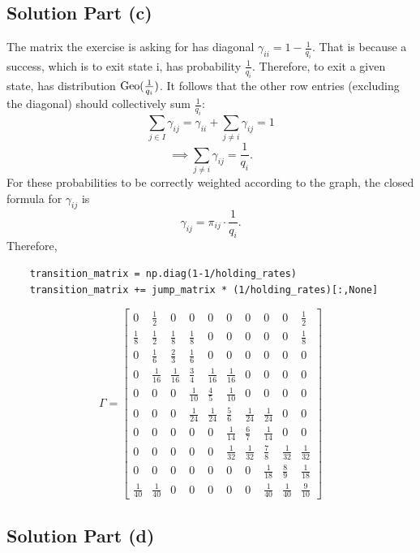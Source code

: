 \subsection*{Solution Part (c)}
The matrix the exercise is asking for has diagonal $\gamma_{ii} = 1-\frac{1}{q_i}$. That is because a success, which is to exit state i, has probability $\frac{1}{q_i}$. Therefore, to exit a given state, has distribution $\hbox{Geo}(\frac{1}{q_i})$. It follows that the other row entries (excluding the diagonal) should collectively sum $\frac{1}{q_i}$:
\[ \sum_{j \in I}\gamma_{ij} = \gamma_{ii} + \sum_{j \neq i} \gamma_{ij} = 1 \]
\[ \implies \sum_{j \neq i} \gamma_{ij} = \frac{1}{q_i}. \]
For these probabilities to be correctly weighted according to the graph, the closed formula for $\gamma_{ij}$ is
\[ \gamma_{ij} = \pi_{ij} \cdot \frac{1}{q_i}. \]
Therefore,
\begin{verbatim}
    transition_matrix = np.diag(1-1/holding_rates)
    transition_matrix += jump_matrix * (1/holding_rates)[:,None]
\end{verbatim}
\[ \Gamma = \left[\begin{matrix}0 & \frac{1}{2} & 0 & 0 & 0 & 0 & 0 & 0 & 0 & \frac{1}{2}\\\frac{1}{8} & \frac{1}{2} & \frac{1}{8} & \frac{1}{8} & 0 & 0 & 0 & 0 & 0 & \frac{1}{8}\\0 & \frac{1}{6} & \frac{2}{3} & \frac{1}{6} & 0 & 0 & 0 & 0 & 0 & 0\\0 & \frac{1}{16} & \frac{1}{16} & \frac{3}{4} & \frac{1}{16} & \frac{1}{16} & 0 & 0 & 0 & 0\\0 & 0 & 0 & \frac{1}{10} & \frac{4}{5} & \frac{1}{10} & 0 & 0 & 0 & 0\\0 & 0 & 0 & \frac{1}{24} & \frac{1}{24} & \frac{5}{6} & \frac{1}{24} & \frac{1}{24} & 0 & 0\\0 & 0 & 0 & 0 & 0 & \frac{1}{14} & \frac{6}{7} & \frac{1}{14} & 0 & 0\\0 & 0 & 0 & 0 & 0 & \frac{1}{32} & \frac{1}{32} & \frac{7}{8} & \frac{1}{32} & \frac{1}{32}\\0 & 0 & 0 & 0 & 0 & 0 & 0 & \frac{1}{18} & \frac{8}{9} & \frac{1}{18}\\\frac{1}{40} & \frac{1}{40} & 0 & 0 & 0 & 0 & 0 & \frac{1}{40} & \frac{1}{40} & \frac{9}{10}\end{matrix}\right]
\]

\subsection*{Solution Part (d)}

